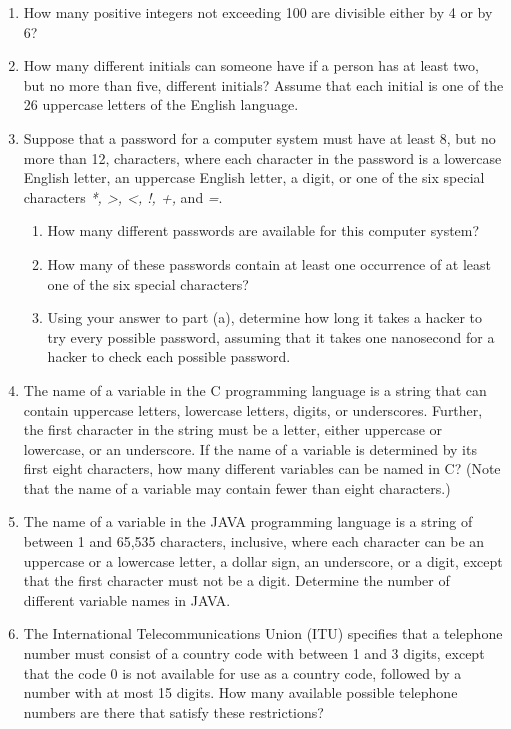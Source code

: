 \documentclass[11pt,a4paper]{book}
\begin{document}
\begin{enumerate}
\item How many positive integers not exceeding 100 are divisible either by 4 or by 6?
\item How many different initials can someone have if a person has at least two, but no more than five, different initials?
Assume that each initial is one of the 26 uppercase letters of the English language.
\item Suppose that a password for a computer system must have at least 8, but no more than 12, characters, where each character in the password is a lowercase English letter, an uppercase English letter, a digit, or one of the six special characters \emph{*, >, <, !, +,} and \emph{=}.
\begin{enumerate}
\item How many different passwords are available for this computer system?
\item How many of these passwords contain at least one occurrence of at least one of the six special characters?
\item Using your answer to part (a), determine how long it takes a hacker to try every possible password, assuming that it takes one nanosecond for a hacker to check each possible password.
\end{enumerate}
\item The name of a variable in the C programming language is a string that can contain uppercase letters, lowercase letters, digits, or underscores. Further, the first character in the string must be a letter, either uppercase or lowercase, or an underscore.
If the name of a variable is determined by its first eight characters, how many different variables can be named in C? (Note that the name of a variable may contain fewer than eight characters.)
\item The name of a variable in the JAVA programming language is a string of between 1 and 65,535 characters, inclusive, where each character can be an uppercase or a lowercase letter, a dollar sign, an underscore, or a digit, except that the first character must not be a digit.
Determine the number of different variable names in JAVA.
\item The International Telecommunications Union (ITU) specifies that a telephone number must consist of a country code with between 1 and 3 digits, except that the code 0 is not available for use as a country code, followed by a number with at most 15 digits.
How many available possible telephone numbers are there that satisfy these restrictions?

\end{enumerate}
\end{document}
